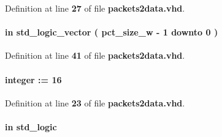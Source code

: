 Definition at line {\bf 27} of file {\bf packets2data.\+vhd}.

\paragraph[{pct\+\_\+size}]{ {\bfseries \textcolor{keywordflow}{in}\textcolor{vhdlchar}{ }} {\bfseries \textcolor{comment}{std\+\_\+logic\+\_\+vector}\textcolor{vhdlchar}{ }\textcolor{vhdlchar}{(}\textcolor{vhdlchar}{ }\textcolor{vhdlchar}{ }\textcolor{vhdlchar}{ }\textcolor{vhdlchar}{ }{\bfseries {\bf pct\+\_\+size\+\_\+w}} \textcolor{vhdlchar}{-\/}\textcolor{vhdlchar}{ } \textcolor{vhdldigit}{1} \textcolor{vhdlchar}{ }\textcolor{keywordflow}{downto}\textcolor{vhdlchar}{ }\textcolor{vhdlchar}{ } \textcolor{vhdldigit}{0} \textcolor{vhdlchar}{ }\textcolor{vhdlchar}{)}\textcolor{vhdlchar}{ }} \hspace{0.3cm}{\ttfamily [Port]}}\label{classpackets2data_a7d76701a4dd683714801b7bda015baa8}


Definition at line {\bf 41} of file {\bf packets2data.\+vhd}.

\paragraph[{pct\+\_\+size\+\_\+w}]{ {\bfseries \textcolor{vhdlchar}{ }} {\bfseries \textcolor{comment}{integer}\textcolor{vhdlchar}{ }\textcolor{vhdlchar}{ }\textcolor{vhdlchar}{\+:}\textcolor{vhdlchar}{=}\textcolor{vhdlchar}{ }\textcolor{vhdlchar}{ } \textcolor{vhdldigit}{16} \textcolor{vhdlchar}{ }} \hspace{0.3cm}{\ttfamily [Generic]}}\label{classpackets2data_a8b069a17d5abb8e45332ec4f70290ec5}


Definition at line {\bf 23} of file {\bf packets2data.\+vhd}.

\paragraph[{pct\+\_\+sync\+\_\+dis}]{ {\bfseries \textcolor{keywordflow}{in}\textcolor{vhdlchar}{ }} {\bfseries \textcolor{comment}{std\+\_\+logic}\textcolor{vhdlchar}{ }} \hspace{0.3cm}{\ttfamily [Port]}}\label{classpackets2data_a5c679cc673022444a3781502a9232e5f}


